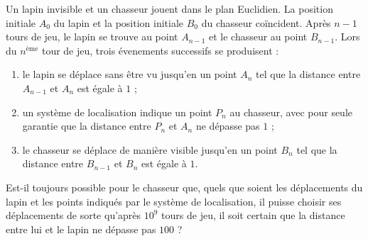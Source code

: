 Un lapin invisible et un chasseur jouent dans le plan Euclidien. La position initiale $A_0$ du lapin et la
position initiale $B_0$ du chasseur coïncident. Après $n - 1$ tours de jeu, le lapin se trouve au point
$A_{n-1}$ et le chasseur au point $B_{n-1}$. Lors du $n^{\text{ème}}$ tour de jeu, trois évenements successifs
se produisent :
\begin{enumerate}
  \item[(i)] le lapin se déplace sans être vu jusqu'en un point $A_n$ tel que la distance entre $A_{n-1}$ et
  $A_n$ est égale à $1$ ;
  \item[(ii)] un système de localisation indique un point $P_n$ au chasseur, avec pour seule garantie que la
  distance entre $P_n$ et $A_n$ ne dépasse pas $1$ ;
  \item[(iii)] le chasseur se déplace de manière visible jusqu'en un point $B_n$ tel que la distance entre
  $B_{n-1}$ et $B_n$ est égale à $1$.
\end{enumerate}

Est-il toujours possible pour le chasseur que, quels que soient les déplacements du lapin et les points
indiqués par le système de localisation, il puisse choisir ses déplacements de sorte qu'après $10^9$ tours de
jeu, il soit certain que la distance entre lui et le lapin ne dépasse pas $100$ ?
